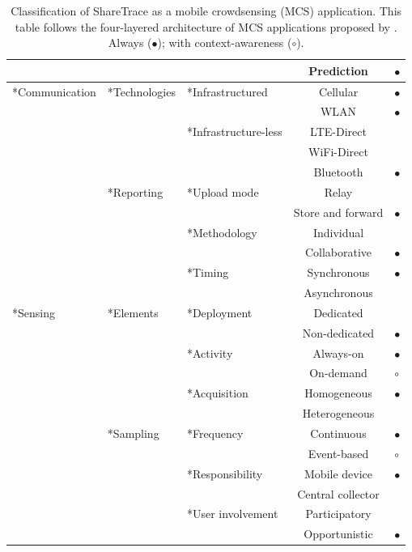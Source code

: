 \begin{table}[htbp]
\begin{tabularx}{\textwidth}{
    >{\centering\arraybackslash}X
    >{\centering\arraybackslash}X
    >{\centering\arraybackslash}X
    c
    >{\centering\arraybackslash}X}
			&&& Prediction & $\bullet$ \\
		\cmidrule{2-5}
\cmidrule{1-5}
\multirow{11}*{Communication}
	& \multirow{5}*{Technologies}
		& \multirow{2}*{Infrastructured}
			& Cellular & $\bullet$ \\
			&&& WLAN & $\bullet$ \\
		\cmidrule{3-5}
		&& \multirow{3}*{Infrastructure-less}
			& LTE-Direct & \\
			&&& WiFi-Direct & \\
			&&& Bluetooth & $\bullet$ \\
		\cmidrule{3-5}
	\cmidrule{2-5}
	& \multirow{6}*{Reporting}
		& \multirow{2}*{Upload mode}
			& Relay & \\
			&&& Store and forward & $\bullet$ \\
		\cmidrule{3-5}
		&& \multirow{2}*{Methodology}
			& Individual & \\
			&&& Collaborative & $\bullet$ \\
		\cmidrule{3-5}
		&& \multirow{2}*{Timing}
			& Synchronous & $\bullet$ \\
			&&& Asynchronous & \\
		\cmidrule{2-5}
\cmidrule{1-5}
\multirow{12}*{Sensing}
	& \multirow{6}*{Elements}
		& \multirow{2}*{Deployment}
			& Dedicated & \\
			&&& Non-dedicated & $\bullet$ \\
		\cmidrule{3-5}
		&& \multirow{2}*{Activity}
			& Always-on & $\bullet$ \\
			&&& On-demand & $\circ$ \\
		\cmidrule{3-5}
		&& \multirow{2}*{Acquisition}
			& Homogeneous & $\bullet$ \\
			&&& Heterogeneous & \\
	\cmidrule{2-5}
	& \multirow{6}*{Sampling}
		& \multirow{2}*{Frequency}
			& Continuous & $\bullet$ \\
			&&& Event-based & $\circ$ \\
		\cmidrule{3-5}
		&& \multirow{2}*{Responsibility}
			& Mobile device & $\bullet$ \\
			&&& Central collector & \\
		\cmidrule{3-5}
        && \multirow{2}*{User involvement}
			& Participatory & \\
			&&& Opportunistic & $\bullet$ \\
\bottomrule
\end{tabularx}
\caption[Classification of ShareTrace as a mobile crowdsensing application]{Classification of ShareTrace as a mobile crowdsensing (MCS) application. This table follows the four-layered architecture of MCS applications proposed by \citet{Capponi2019}. Always ($\bullet$); with context-awareness ($\circ$).}
\label{tab:classification}
\end{table}